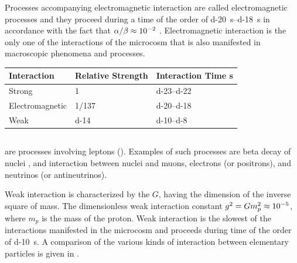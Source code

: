 Processes accompanying electromagnetic interaction are called electromagnetic processes and they proceed during a time of the order of \SIrange{d-20}{d-18}{\second} in accordance with the fact that $\alpha/\beta \approx \num{d-2}$ . Electromagnetic interaction is the only one of the interactions of the microcosm that is also manifested in macroscopic phenomena and processes.

\begin{small}
\begin{table}
\begin{center}
\begin{tabular}{p{2.5cm}p{2cm}p{2.5cm}}
\toprule
\textbf{Interaction} & \textbf{Relative Strength} & \textbf{Interaction Time} s\\
\midrule
Strong & 1 & \numrange{d-23}{d-22} \\
Electromagnetic & 1/137 & \numrange{d-20}{d-18} \\
Weak & \num{d-14} & \numrange{d-10}{d-8} \\
\bottomrule
\end{tabular}
\end{center}
\end{table}
\end{small}

\subsection{}\label{43.2.8}  are processes involving leptons (). Examples of such processes are beta decay of nuclei , and interaction between nuclei and muons, electrons (or positrons), and neutrinos (or antineutrinos).

Weak interaction is characterized by the  $G$, having the dimension of the inverse square of mass. The dimensionless weak interaction constant $g^{2} = Gm_{p}^{2} \approx \num{d-5}$, where $m_{p}$ is the mass of the proton. Weak interaction is the
slowest of the interactions manifested in the microcosm and
proceeds during time of the order of \SI{d-10}{\second}. A comparison of the various kinds of interaction between elementary particles is given in .

